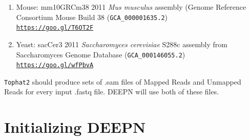 \documentclass[11pt,fleqn]{book} %
\begin{document}
\begin{enumerate}
	\item Mouse: mm10\/GRCm38 2011 \emph{Mus musculus} assembly (Genome Reference Consortium Mouse Build 38 (\texttt{GCA\_000001635.2})\\
	\texttt{\href{https://goo.gl/T6OT2F}{https://goo.gl/T6OT2F}}
	\item Yeast: sacCer3 2011 \emph{Saccharomyces cerevisiae} S288c assembly from Saccharomyces Genome Database (\texttt{GCA\_000146055.2})\\
	\texttt{\href{https://goo.gl/wfPbvA}{https://goo.gl/wfPbvA}}
\end{enumerate}

\texttt{Tophat2} should produce sets of .sam files of Mapped Reads and Unmapped Reads for every input .fastq file.  DEEPN will use both of these files.

\section{Initializing DEEPN}
\end{document}
